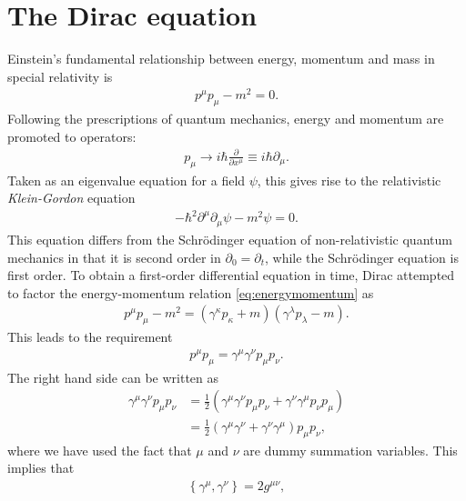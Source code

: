 \documentclass[twoside,english]{uiofysmaster}
\begin{document}
\appendix




\chapter{The Dirac equation}
\label{appendix:diraceq}

Einstein's fundamental relationship between energy, momentum and mass in special relativity is
\begin{align}
  p^\mu p_\mu - m^2 = 0.\label{eq:energymomentum}
\end{align}
Following the prescriptions of quantum mechanics, energy and momentum are promoted to operators:
\begin{align}
	p_\mu \to i\hbar \frac{\partial}{\partial x^\mu} \equiv i\hbar \partial_\mu.
\end{align}
Taken as an eigenvalue equation for a field $\psi$, this gives rise to the relativistic {\it Klein-Gordon} equation
\begin{align}
	-\hbar^2 \partial^\mu \partial_\mu \psi - m^2 \psi = 0.
\end{align}
This equation differs from the Schr\"{o}dinger equation of non-relativistic quantum mechanics in that it is second order in $\partial_{0} = \partial_t$, while the Schr\"{o}dinger equation is first order. To obtain a first-order differential equation in time, Dirac attempted \cite{griffiths:elementary_particles} to factor the energy-momentum relation \eqref{eq:energymomentum} as
\begin{align}
	p^\mu p_\mu - m^2 = \left(\gamma^\kappa p_\kappa + m\right)\left(\gamma^\lambda p_\lambda - m\right).
\end{align}
This leads to the requirement
\begin{align}
	p^\mu p_\mu = \gamma^\mu \gamma^\nu p_\mu p_\nu.
\end{align}
The right hand side can be written as
\begin{align}
	\gamma^\mu \gamma^\nu p_\mu p_\nu &= \frac{1}{2}\left( \gamma^\mu \gamma^\nu p_\mu p_\nu + \gamma^\nu \gamma^\mu p_\nu p_\mu \right)\\
	&= \frac{1}{2}\left( \gamma^\mu \gamma^\nu  + \gamma^\nu \gamma^\mu \right) p_\mu p_\nu,
\end{align}
where we have used the fact that $\mu$ and $\nu$ are dummy summation variables. This implies that
\begin{align}
	\left\{ \gamma^\mu, \gamma^\nu \right\} = 2g^{\mu\nu},
\end{align}
\end{document}

